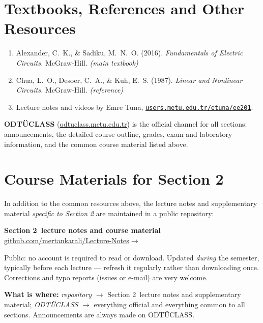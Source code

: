 \documentclass[10pt,a4paper]{article}
\newcommand{\mysection}{Section 2}
\newcommand{\notesrepo}{https://github.com/mertankarali/Lecture-Notes/tree/master/METU-EE201}
\newcommand{\notesrepotext}{github.com/mertankarali/Lecture-Notes}
\newcommand{\odtuclass}{https://odtuclass.metu.edu.tr}
\newcommand{\tunanotes}{https://users.metu.edu.tr/etuna/ee201/}
\newcommand{\tunanotestext}{users.metu.edu.tr/etuna/ee201}
\begin{document}
\section{Textbooks, References and Other Resources}

\begin{enumerate}
  \item Alexander, C.~K., \& Sadiku, M.~N.~O. (2016). \emph{Fundamentals of Electric Circuits.}
        McGraw-Hill. \hfill \textit{(main textbook)}
  \item Chua, L.~O., Desoer, C.~A., \& Kuh, E.~S. (1987). \emph{Linear and Nonlinear Circuits.}
        McGraw-Hill. \hfill \textit{(reference)}
  \item Lecture notes and videos by Emre Tuna, \href{\tunanotes}{\texttt{\tunanotestext}}.
\end{enumerate}

\textbf{ODTÜCLASS} (\href{\odtuclass}{odtuclass.metu.edu.tr}) is the official channel for all
sections: announcements, the detailed course outline, grades, exam and laboratory information,
and the common course material listed above.

\section{Course Materials for \mysection}

In addition to the common resources above, the lecture notes and supplementary material
\emph{specific to \mysection} are maintained in a public repository:

\begin{notebox}
\begin{center}
  \textbf{\mysection\ lecture notes and course material}\\[2pt]
  {\ttfamily\href{\notesrepo}{\notesrepotext}}\;\;$\rightarrow$\;
\end{center}
\vspace{-0.2em}
\scriptsize
Public: no account is required to read or download. Updated \emph{during} the semester,
typically before each lecture --- refresh it regularly rather than downloading once.
Corrections and typo reports (issues or e-mail) are very welcome.
\end{notebox}
\vspace{-0.2em}

\textbf{What is where:} \emph{repository} $\rightarrow$ \mysection\ lecture notes and
supplementary material; \emph{ODTÜCLASS} $\rightarrow$ everything official and everything
common to all sections.
Announcements are always made on ODTÜCLASS.
\end{document}
